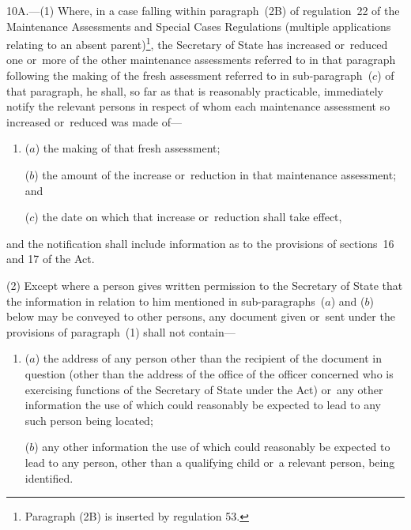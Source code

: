 \documentclass[a4paper,12pt]{article}
\begin{document}
10A.—(1) Where, in a case falling within paragraph~(2B) of regulation~22 of the Maintenance Assessments and Special Cases Regulations (multiple applications relating to an absent parent)\footnote{\frenchspacing Paragraph (2B) is inserted by regulation 53.}, 
the Secretary of State  %
has increased or~reduced one or~more of the other maintenance assessments referred to in that paragraph following the making of the fresh assessment referred to in sub-paragraph~($c$) of that paragraph, he shall, so far as that is reasonably practicable, immediately notify the relevant persons in respect of whom each maintenance assessment so increased or~reduced was made of—
\begin{enumerate}\item[]
($a$) the making of that fresh assessment;

($b$) the amount of the increase or~reduction in that maintenance assessment; and

($c$) the date on which that increase or~reduction shall take effect,
\end{enumerate}
and the notification shall include information as to the provisions of 
sections~16 and 17  %
of the Act.

(2) Except where a person gives written permission to the Secretary of State that the information in relation to him mentioned in sub-paragraphs~($a$) and ($b$) below may be conveyed to other persons, any document given or~sent under the provisions of paragraph~(1) shall not contain—
\begin{enumerate}\item[]
($a$) the address of any person other than the recipient of the document in question (other than the address of the office 
of the officer concerned who is exercising functions of the Secretary of State under the Act)  %
or~any other information the use of which could reasonably be expected to lead to any such person being located;

($b$) any other information the use of which could reasonably be expected to lead to any person, other than a qualifying child or~a relevant person, being identified.
\end{enumerate}

\end{document}
